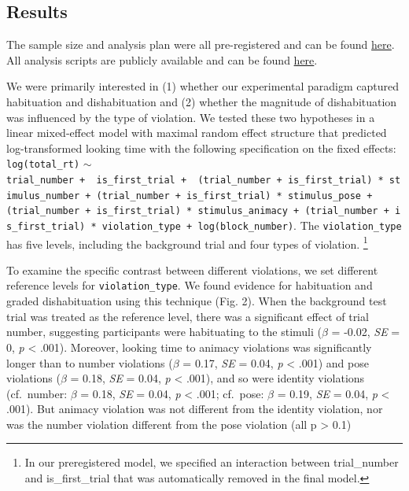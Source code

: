 \documentclass[10pt, letterpaper]{article}
\begin{document}
\hypertarget{results}{%
\subsection{Results}\label{results}}

The sample size and analysis plan were all pre-registered and can be
found \href{https://aspredicted.org/blind.php?x=WGF_J7K}{here}. All
analysis scripts are publicly available and can be found
\href{https://anonymous.4open.science/r/pokebaby_cogsci2024-3636/README.md}{here}.

We were primarily interested in (1) whether our experimental paradigm
captured habituation and dishabituation and (2) whether the magnitude of
dishabituation was influenced by the type of violation. We tested these
two hypotheses in a linear mixed-effect model with maximal random effect
structure that predicted log-transformed looking time with the following
specification on the fixed effects: \texttt{log(total\_rt)} \(\sim\)
\texttt{trial\_number\ +\ \ is\_first\_trial\ +\ \ (trial\_number\ +\ is\_first\_trial)\ *\ stimulus\_number\ +\ (trial\_number\ +\ is\_first\_trial)\ *\ stimulus\_pose\ +(trial\_number\ +\ is\_first\_trial)\ *\ stimulus\_animacy\ +\ (trial\_number\ +\ is\_first\_trial)\ *\ violation\_type\ +\ log(block\_number)}.
The \texttt{violation\_type} has five levels, including the background
trial and four types of violation. \footnote{In our preregistered model,
  we specified an interaction between trial\_number and is\_first\_trial
  that was automatically removed in the final model.}

To examine the specific contrast between different violations, we set
different reference levels for \texttt{violation\_type}. We found
evidence for habituation and graded dishabituation using this technique
(Fig. 2). When the background test trial was treated as the reference
level, there was a significant effect of trial number, suggesting
participants were habituating to the stimuli (\(\beta\) = -0.02,
\emph{SE} = 0, \emph{p} \textless{} .001). Moreover, looking time to
animacy violations was significantly longer than to number violations
(\(\beta\) = 0.17, \emph{SE} = 0.04, \emph{p} \textless{} .001) and pose
violations (\(\beta\) = 0.18, \emph{SE} = 0.04, \emph{p} \textless{}
.001), and so were identity violations (cf.~number: \(\beta\) = 0.18,
\emph{SE} = 0.04, \emph{p} \textless{} .001; cf.~pose: \(\beta\) = 0.19,
\emph{SE} = 0.04, \emph{p} \textless{} .001). But animacy violation was
not different from the identity violation, nor was the number violation
different from the pose violation (all p \textgreater{} 0.1)
\end{document}
